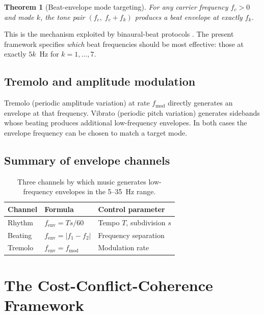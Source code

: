 \documentclass[11pt,a4paper]{article}
\newtheorem{theorem}{Theorem}
\begin{document}
\begin{theorem}[Beat-envelope mode targeting]
\label{thm:beat}
For any carrier frequency $f_c > 0$ and mode $k$, the tone pair
$(f_c,\; f_c + f_k)$ produces a beat envelope at exactly $f_k$.
\end{theorem}

\noindent This is the mechanism exploited by binaural-beat protocols
\citep{oster1973}. The present framework specifies \emph{which}
beat frequencies should be most effective: those at exactly $5k$~Hz for
$k=1,\ldots,7$.

\subsection{Tremolo and amplitude modulation}

Tremolo (periodic amplitude variation) at rate $f_{\mathrm{mod}}$ directly
generates an envelope at that frequency. Vibrato (periodic pitch
variation) generates sidebands whose beating produces additional
low-frequency envelopes. In both cases the envelope frequency can be
chosen to match a target mode.

\subsection{Summary of envelope channels}

\begin{table}[H]
\centering
\caption{Three channels by which music generates low-frequency envelopes
in the 5--35~Hz range.}
\label{tab:channels}
\begin{tabular}{@{}lll@{}}
\toprule
Channel & Formula & Control parameter \\
\midrule
Rhythm    & $f_{\mathrm{env}} = Ts/60$ & Tempo $T$, subdivision $s$ \\
Beating   & $f_{\mathrm{env}} = |f_1 - f_2|$ & Frequency separation \\
Tremolo   & $f_{\mathrm{env}} = f_{\mathrm{mod}}$ & Modulation rate \\
\bottomrule
\end{tabular}
\end{table}

\section{The Cost-Conflict-Coherence Framework}
\label{sec:conflict}
\end{document}
